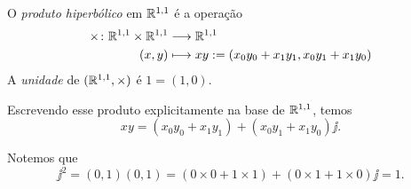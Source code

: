 \begin{definition}
O \emph{produto hiperbólico} em $\mathbb{R}^{1,1}$ é a operação
	\begin{align*}
	{\times}\colon {\mathbb{R}^{1,1} \times \mathbb{R}^{1,1}} &\longrightarrow {\mathbb{R}^{1,1}} \\{(x,y)} &\longmapsto xy := (x_0y_0 + x_1y_1, x_0y_1+x_1y_0)
	\end{align*}
A \emph{unidade} de $(\mathbb{R}^{1,1},\times)$ é $1 = (1,0)$.
\end{definition}

Escrevendo esse produto explicitamente na base de $\mathbb{R}^{1,1}$, temos
	\begin{equation*}
	xy = (x_0y_0 + x_1y_1) + (x_0y_1+x_1y_0)\jj.
	\end{equation*}

Notemos que
	\begin{equation*}
	\jj^2 = (0,1)(0,1) = (0 \times 0 + 1 \times 1) + (0 \times 1 + 1 \times 0)\jj = 1.
	\end{equation*}

